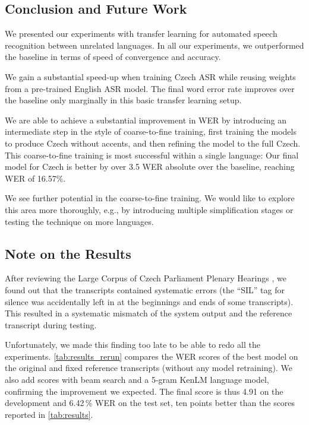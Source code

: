 \subsection{Conclusion and Future Work}
\label{sec:conclusion}

We presented our experiments with transfer learning for automated speech recognition between unrelated languages.
In all our experiments, we outperformed the baseline in terms of speed of convergence and accuracy.

We gain a substantial speed-up when training Czech ASR while reusing weights
from a pre-trained English ASR model. The final word error rate improves over
the baseline only marginally in this basic transfer learning setup.

We are able to achieve a substantial improvement in WER by introducing an intermediate step in the style of coarse-to-fine training, first training the models to produce Czech without accents, and then refining the model to the full Czech.
This coarse-to-fine training is most successful within a single language: Our final model for Czech is better by over 3.5 WER absolute over the baseline, reaching WER of 16.57\%. %


We see further potential in the coarse-to-fine training. We would like to explore this area more thoroughly, e.g., by introducing multiple simplification stages or testing the technique on more languages.


\subsection{Note on the Results}
After reviewing the Large Corpus of Czech Parliament Plenary Hearings
\cite{dataset}, we found out that the transcripts contained systematic errors
(the ``SIL'' tag for silence was accidentally left in at the beginnings and ends of some transcripts). This resulted in a systematic mismatch of the system output and the reference transcript during testing. 

Unfortunately, we made this finding too late to be able to redo all the
experiments.
\cref{tab:results_rerun} compares the WER scores of the best model on the
original and fixed reference transcripts (without any model retraining). We also add scores with beam search
and a 5-gram KenLM  language model, confirming the improvement we expected.
The final score is thus 4.91 on the development and 6.42\,\% WER on the test
set, ten points better than the scores reported in \cref{tab:results}.

